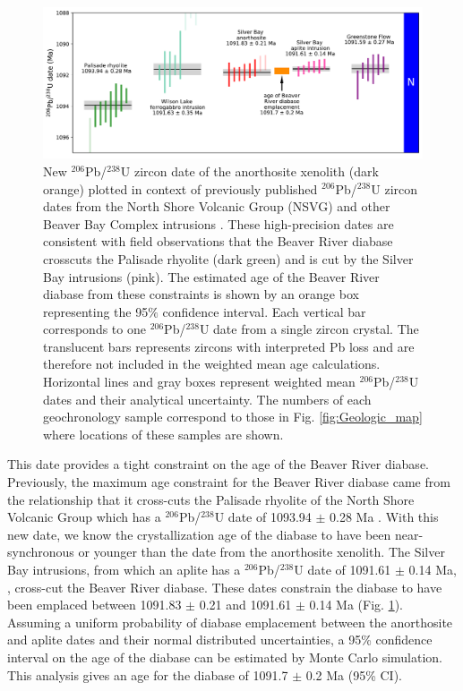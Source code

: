 \documentclass[draft]{agujournal2019}
\begin{document}
\begin{figure}
\noindent\includegraphics[width=\textwidth]{BBC_dates.pdf}
\caption{\footnotesize{New $^{206}$Pb/$^{238}$U zircon date of the anorthosite xenolith (dark orange) plotted in context of previously published $^{206}$Pb/$^{238}$U zircon dates from the North Shore Volcanic Group (NSVG) and other Beaver Bay Complex intrusions \cite{Swanson-Hysell2019a, Swanson-Hysell2020a}. These high-precision dates are consistent with field observations that the Beaver River diabase crosscuts the Palisade rhyolite (dark green) and is cut by the Silver Bay intrusions (pink). The estimated age of the Beaver River diabase from these constraints is shown by an orange box representing the 95$\%$ confidence interval. Each vertical bar corresponds to one $^{206}$Pb/$^{238}$U date from a single zircon crystal. The translucent bars represents zircons with interpreted Pb loss and are therefore not included in the weighted mean age calculations. Horizontal lines and gray boxes represent weighted mean $^{206}$Pb/$^{238}$U dates and their analytical uncertainty. The numbers of each geochronology sample correspond to those in Fig. \ref{fig:Geologic_map} where locations of these samples are shown.}}
\label{fig:BBC_geochron}
\end{figure}

This date provides a tight constraint on the age of the Beaver River diabase. Previously, the maximum age constraint for the Beaver River diabase came from the relationship that it cross-cuts the Palisade rhyolite of the North Shore Volcanic Group which has a $^{206}$Pb/$^{238}$U date of 1093.94 $\pm$ 0.28 Ma  \cite{Swanson-Hysell2019a}. With this new date, we know the crystallization age of the diabase to have been near-synchronous or younger than the date from the anorthosite xenolith. The Silver Bay intrusions, from which an aplite has a $^{206}$Pb/$^{238}$U date of 1091.61 $\pm$ 0.14 Ma, \cite{Fairchild2017a}, cross-cut the Beaver River diabase. These dates constrain the diabase to have been emplaced between 1091.83 $\pm$ 0.21 and 1091.61 $\pm$ 0.14 Ma (Fig. \ref{fig:BBC_geochron}). Assuming a uniform probability of diabase emplacement between the anorthosite and aplite dates and their normal distributed uncertainties, a 95\% confidence interval on the age of the diabase can be estimated by Monte Carlo simulation. This analysis gives an age for the diabase of 1091.7 $\pm$ 0.2 Ma (95\% CI). 
\end{document}
